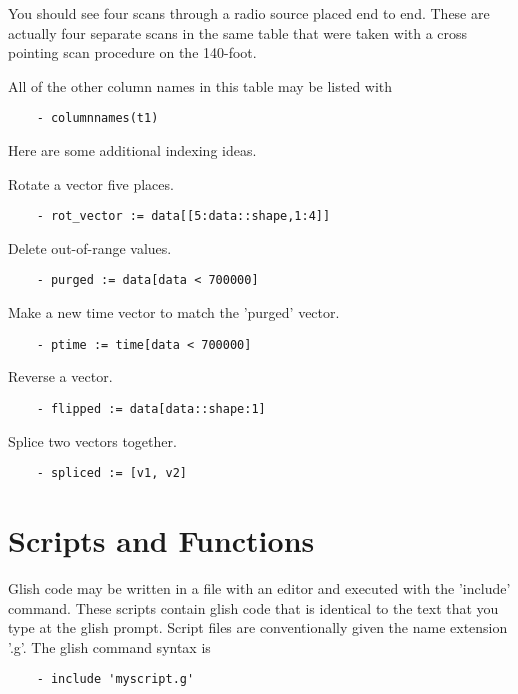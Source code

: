 You should see four scans through a radio source placed end to end.  These
are actually four separate scans in the same table that were taken with a
cross pointing scan procedure on the 140-foot.

    All of the other column names in this table may be listed with

\begin{verbatim}
	- columnnames(t1)
\end{verbatim}

    Here are some additional indexing ideas.

Rotate a vector five places.

\begin{verbatim}
	- rot_vector := data[[5:data::shape,1:4]]
\end{verbatim}

Delete out-of-range values.

\begin{verbatim}
	- purged := data[data < 700000]
\end{verbatim}

Make a new time vector to match the 'purged' vector.

\begin{verbatim}
	- ptime := time[data < 700000]
\end{verbatim}

Reverse a vector.

\begin{verbatim}
	- flipped := data[data::shape:1]
\end{verbatim}

Splice two vectors together.

\begin{verbatim}
	- spliced := [v1, v2]
\end{verbatim}

\section{Scripts and Functions}

    Glish code may be written in a file with an editor and executed with
the 'include' command.  These scripts contain glish code that is identical
to the text that you type at the glish prompt.  Script files are
conventionally given the name extension '.g'.  The glish command syntax is

\begin{verbatim}
	- include 'myscript.g'
\end{verbatim}

